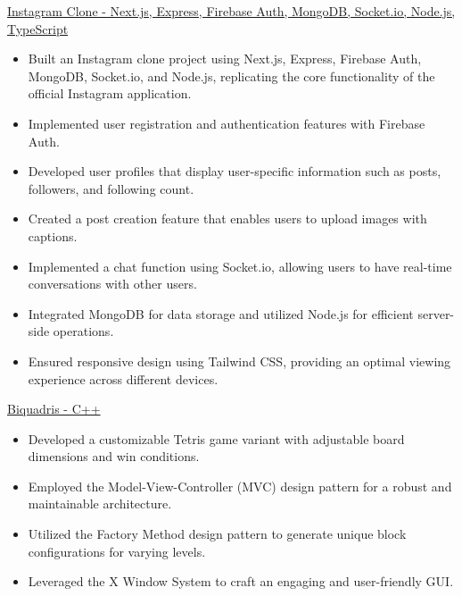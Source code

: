 \documentclass[letterpaper,11pt]{article}
\newcommand{\resumeItem}[2]{
  \item\small{
    #1{ #2 \vspace{2pt}}
  }
}
\newcommand{\resumeSubItem}[2]{\resumeItem{#1}{#2}\vspace{0pt}}
\begin{document}
\resumeSubItem{\href{https://github.com/pl3lee/instagram-clone}{Instagram Clone - Next.js, Express, Firebase Auth, MongoDB, Socket.io, Node.js, TypeScript}}
{\begin{itemize}
		\item Built an Instagram clone project using Next.js, Express, Firebase Auth, MongoDB, Socket.io, and Node.js, replicating the core functionality of the official Instagram application.
		\item Implemented user registration and authentication features with Firebase Auth.
		\item Developed user profiles that display user-specific information such as posts, followers, and following count.
		\item Created a post creation feature that enables users to upload images with captions.
		\item Implemented a chat function using Socket.io, allowing users to have real-time conversations with other users.
		\item Integrated MongoDB for data storage and utilized Node.js for efficient server-side operations.
		\item Ensured responsive design using Tailwind CSS, providing an optimal viewing experience across different devices.
	\end{itemize}}
\resumeSubItem{\href{https://github.com/pl3lee/Biquadris}{Biquadris - C++}}
{\begin{itemize}
		\item Developed a customizable Tetris game variant with adjustable board dimensions and win conditions.
		\item Employed the Model-View-Controller (MVC) design pattern for a robust and maintainable architecture.
		\item Utilized the Factory Method design pattern to generate unique block configurations for varying levels.
		\item Leveraged the X Window System to craft an engaging and user-friendly GUI.
	\end{itemize}}
\end{document}
